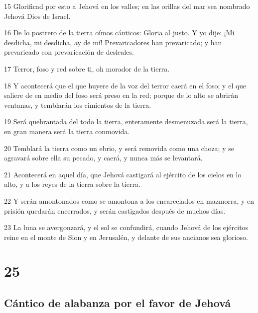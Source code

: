 \par 15 Glorificad por esto a Jehová en los valles; en las orillas del mar sea nombrado Jehová Dios de Israel.
\par 16 De lo postrero de la tierra oímos cánticos: Gloria al justo. Y yo dije: ¡Mi desdicha, mi desdicha, ay de mí! Prevaricadores han prevaricado; y han prevaricado con prevaricación de desleales.
\par 17 Terror, foso y red sobre ti, oh morador de la tierra.
\par 18 Y acontecerá que el que huyere de la voz del terror caerá en el foso; y el que saliere de en medio del foso será preso en la red; porque de lo alto se abrirán ventanas, y temblarán los cimientos de la tierra.
\par 19 Será quebrantada del todo la tierra, enteramente desmenuzada será la tierra, en gran manera será la tierra conmovida.
\par 20 Temblará la tierra como un ebrio, y será removida como una choza; y se agravará sobre ella su pecado, y caerá, y nunca más se levantará.
\par 21 Acontecerá en aquel día, que Jehová castigará al ejército de los cielos en lo alto, y a los reyes de la tierra sobre la tierra.
\par 22 Y serán amontonados como se amontona a los encarcelados en mazmorra, y en prisión quedarán encerrados, y serán castigados después de muchos días.
\par 23 La luna se avergonzará, y el sol se confundirá, cuando Jehová de los ejércitos reine en el monte de Sion y en Jerusalén, y delante de sus ancianos sea glorioso.

\chapter{25}

\section*{Cántico de alabanza por el favor de Jehová}

